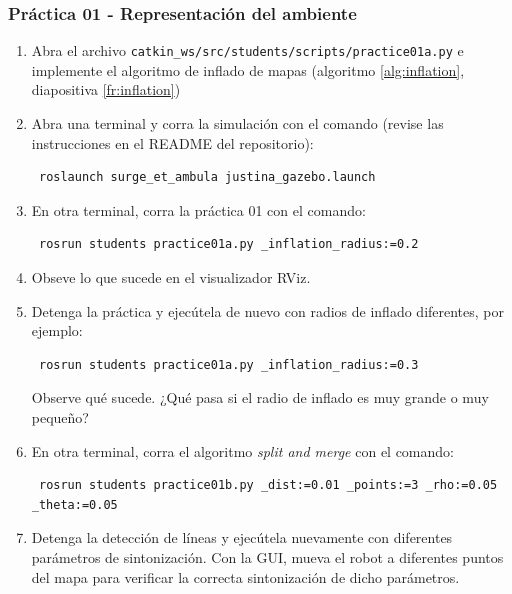 \begin{frame}[containsverbatim]\frametitle{Práctica 01 - Representación del ambiente}
  \begin{enumerate}
  \item Abra el archivo \texttt{catkin\_ws/src/students/scripts/practice01a.py} e implemente el algoritmo de inflado de mapas (algoritmo \ref{alg:inflation}, diapositiva \ref{fr:inflation})
  \item Abra una terminal y corra la simulación con el comando (revise las instrucciones en el README del repositorio):
\begin{verbatim}
 roslaunch surge_et_ambula justina_gazebo.launch
\end{verbatim}
  \item En otra terminal, corra la práctica 01 con el comando:
\begin{verbatim}
 rosrun students practice01a.py _inflation_radius:=0.2
\end{verbatim}
  \item Obseve lo que sucede en el visualizador RViz.
  \item Detenga la práctica y ejecútela de nuevo con radios de inflado diferentes, por ejemplo:
\begin{verbatim}
 rosrun students practice01a.py _inflation_radius:=0.3
\end{verbatim}
Observe qué sucede. ¿Qué pasa si el radio de inflado es muy grande o muy pequeño?
  \item En otra terminal, corra el algoritmo \textit{split and merge} con el comando:
\begin{verbatim}
 rosrun students practice01b.py _dist:=0.01 _points:=3 _rho:=0.05 _theta:=0.05
\end{verbatim}
\item Detenga la detección de líneas y ejecútela nuevamente con diferentes parámetros de sintonización. Con la GUI, mueva el robot a diferentes puntos del mapa para verificar la correcta sintonización de dicho parámetros.
  \end{enumerate}
\end{frame}

